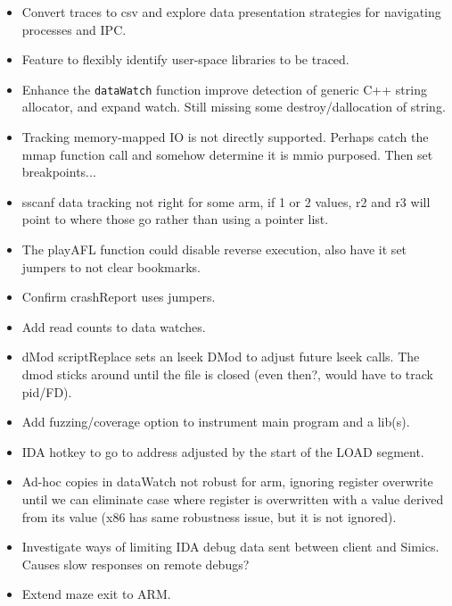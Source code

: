 \documentclass[titlepage]{article}
\begin{document}
\begin{appendices}
\begin{itemize}
\item Convert traces to csv and explore data presentation strategies for navigating processes and IPC.

\item Feature to flexibly identify user-space libraries to be traced.

\item Enhance the {\tt dataWatch} function improve detection of generic C++ string allocator, and expand watch.  Still missing some destroy/dallocation
of string.

\item Tracking memory-mapped IO is not directly supported.  Perhaps catch the mmap function call and somehow determine it is mmio purposed.  Then
set breakpoints...

\item sscanf data tracking not right for some arm, if 1 or 2 values, r2 and r3 will point to where those go rather than using a pointer list.

\item The playAFL function could disable reverse execution, also have it set jumpers to not clear bookmarks.

\item Confirm crashReport uses jumpers.

\item Add read counts to data watches.

\item dMod scriptReplace sets an lseek DMod to adjust future lseek calls.  The dmod sticks around until the file is closed (even then?, would 
have to track pid/FD).

\item Add fuzzing/coverage option to instrument main program and a lib(s).

\item IDA hotkey to go to address adjusted by the start of the LOAD segment.

\item Ad-hoc copies in dataWatch not robust for arm, ignoring register overwrite until we can eliminate case where register is overwritten
with a value derived from its value (x86 has same robustness issue, but it is not ignored).

\item Investigate ways of limiting IDA debug data sent between client and Simics.  Causes slow responses on remote debugs?

\item Extend maze exit to ARM.


\end{itemize}
\end{appendices}
\end{document}
